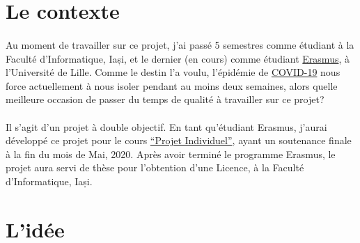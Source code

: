 \section{Le contexte}
\paragraph{}
Au moment de travailler sur ce projet, j'ai passé 5 semestres comme étudiant à la Faculté d'Informatique, Iași, et le dernier (en cours) comme étudiant \href{https://ec.europa.eu/programmes/erasmus-plus/about_en}{Erasmus}, à l'Université de Lille.
Comme le destin l'a voulu, l'épidémie de \href{https://en.wikipedia.org/wiki/2019-20_coronavirus_pandemic-20_coronavirus_pandémique}{COVID-19} nous force actuellement à nous isoler pendant au moins deux semaines, alors quelle meilleure occasion de passer du temps de qualité à travailler sur ce projet?
\paragraph{}
Il s'agit d'un projet à double objectif.
En tant qu'étudiant Erasmus, j'aurai développé ce projet pour le cours \href{https://www.fil.univ-lille1.fr/portail/index.php?dipl=MInfo&sem=S8&ue=PJI&label=Présentation}{``Projet Individuel''}, ayant un soutenance finale à la fin du mois de Mai, 2020.
Après avoir terminé le programme Erasmus, le projet aura servi de thèse pour l'obtention d'une Licence, à la Faculté d'Informatique, Iași.

\section{L'idée}
